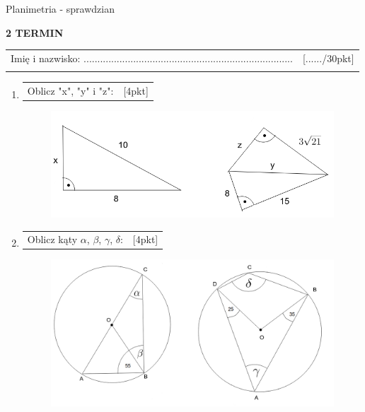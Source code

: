 \documentclass[12pt,a4paper]{article}
\begin{document}
	\begin{center}
		\LARGE Planimetria - sprawdzian
	\end{center}
	\vspace{1.5cm}
	\begin{flushright}
		\textbf{2 TERMIN}
	\end{flushright}
	\begin{tabular}{p{13cm} r}
		Imię i nazwisko: ............................................................................
		&[....../30pkt]\\ 
		\vspace{0.5cm}
	\end{tabular}
	\begin{enumerate}[1.]
		\item  \begin{tabular}{p{13cm} r}	%
			Oblicz "x", "y" i "z": &[4pkt]\\ 
		\end{tabular}
		\begin{figure}[h]
			\includegraphics[scale=0.8]{tp1}
		\end{figure}
		
		\item  \begin{tabular}{p{13cm} r}	%
			Oblicz kąty $\alpha$, $\beta$, $\gamma$, $\delta$: &[4pkt]\\ 
		\end{tabular}
		\begin{figure}[h]
			\includegraphics[scale=0.4]{p2}
		\end{figure}
		

\end{enumerate}
\end{document}
